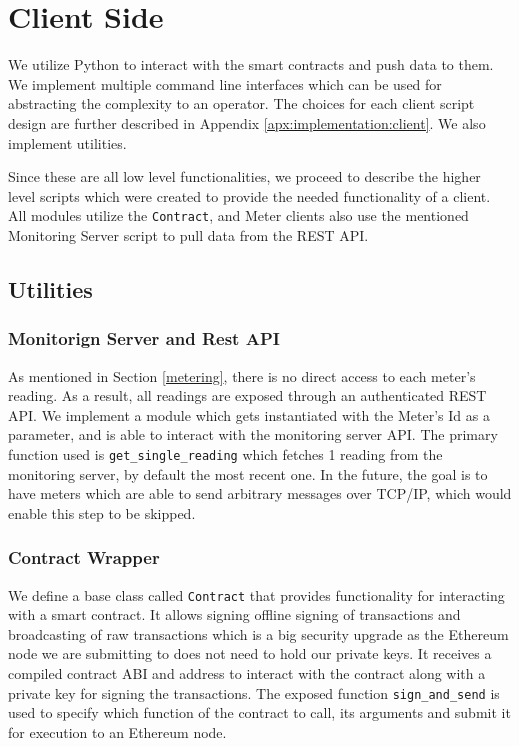 

\section{Client Side} \label{ch:implementation:client}

We utilize Python to interact with the smart contracts and push data to them. We implement multiple command line interfaces which can be used for abstracting the complexity to an operator. The choices for each client script design are further described in Appendix \ref{apx:implementation:client}. We also implement utilities.

Since these are all low level functionalities, we proceed to describe the higher level scripts which were created to provide the needed functionality of a client. All modules utilize the \texttt{Contract}, and Meter clients also use the mentioned Monitoring Server script to pull data from the REST API.


\subsection{Utilities}
\subsubsection*{Monitorign Server and Rest API}
As mentioned in Section \ref{metering}, there is no direct access to each meter's reading. As a result, all readings are exposed through an authenticated REST API. We implement a module which gets instantiated with the Meter's Id as a parameter, and is able to interact with the monitoring server API. The primary function used is \texttt{get\_single\_reading} which fetches 1 reading from the monitoring server, by default the most recent one. In the future, the goal is to have meters which are able to send arbitrary messages over TCP/IP, which would enable this step to be skipped. 

\subsubsection*{Contract Wrapper}
We define a base class called \texttt{Contract} that provides functionality for interacting  with a smart contract. It allows signing offline signing of transactions and broadcasting of raw transactions which is a big security upgrade as the Ethereum node we are submitting to does not need to hold our private keys. It receives a compiled contract ABI and address to interact with the contract along with a private key for signing the transactions. The exposed function \texttt{sign\_and\_send} is used to specify which function of the contract to call, its arguments and submit it for execution to an Ethereum node.

